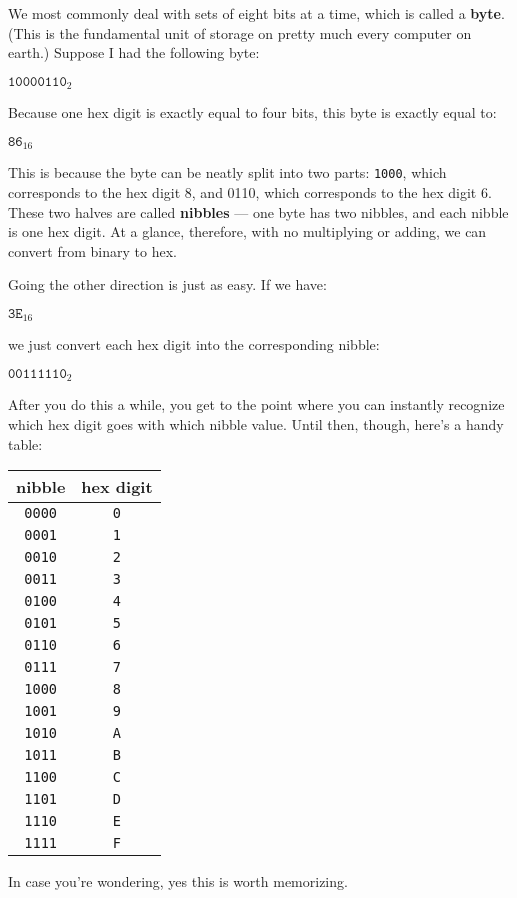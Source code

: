 We most commonly deal with sets of eight bits at a time, which is called a
\textbf{byte}. (This is the fundamental unit of storage on pretty much
every computer on earth.) Suppose I had the following byte:
\begin{center}
{\large
$\texttt{10000110}_2$
}
\end{center}
Because one hex digit is exactly equal to four bits, this byte is exactly
equal to:
\begin{center}
{\large
$\texttt{86}_{16}$
}
\end{center}
This is because the byte can be neatly split into two parts: \texttt{1000},
which corresponds to the hex digit 8, and 0110, which corresponds to the
hex digit 6. These two halves are called \textbf{nibbles} --- one byte has
two nibbles, and each nibble is one hex digit. At a glance, therefore, with
no multiplying or adding, we can convert from binary to hex.

Going the other direction is just as easy. If we have:
\begin{center}
{\large
$\texttt{3E}_{16}$
}
\end{center}
we just convert each hex digit into the corresponding nibble:
\begin{center}
{\large
$\texttt{00111110}_2$
}
\end{center}
After you do this a while, you get to the point where you can instantly
recognize which hex digit goes with which nibble value. Until then, though,
here's a handy table:
\label{nibbletable}
\begin{center}
\begin{tabular}{|c|c|}
\hline
nibble & hex digit \\
\hline
\texttt{0000} & \texttt{0} \\
\texttt{0001} & \texttt{1} \\
\texttt{0010} & \texttt{2} \\
\texttt{0011} & \texttt{3} \\
\texttt{0100} & \texttt{4} \\
\texttt{0101} & \texttt{5} \\
\texttt{0110} & \texttt{6} \\
\texttt{0111} & \texttt{7} \\
\texttt{1000} & \texttt{8} \\
\texttt{1001} & \texttt{9} \\
\texttt{1010} & \texttt{A} \\
\texttt{1011} & \texttt{B} \\
\texttt{1100} & \texttt{C} \\
\texttt{1101} & \texttt{D} \\
\texttt{1110} & \texttt{E} \\
\texttt{1111} & \texttt{F} \\
\hline
\end{tabular}
\end{center}
In case you're wondering, yes this is worth memorizing.


